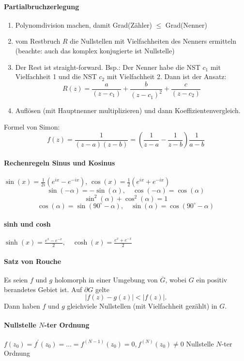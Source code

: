 \documentclass[a4paper, 10pt, DIV20, headings=small]{scrartcl}
\theoremstyle{definition}
\theoremstyle{plain}
\begin{document}
\paragraph{Partialbruchzerlegung}
\begin{enumerate}
\item Polynomdivision machen, damit Grad(Zähler) $\leq$ Grad(Nenner)
\item vom Restbruch $R$ die Nullstellen mit Vielfachheiten des Nenners ermitteln (beachte: auch das komplex konjugierte ist Nullstelle)
\item Der Rest ist straight-forward. Bsp.: Der Nenner habe die NST $c_1$ mit Vielfachheit 1 und die NST $c_2$ mit Vielfachheit 2. Dann ist der Ansatz: $$R(z) = \frac{a}{(z-c_1)} + \frac{b}{(z-c_1)^2} + \frac{c}{(z-c_2)}$$
\item Auflösen (mit Hauptnenner multiplizieren) und dann Koeffizientenvergleich.
\end{enumerate}
Formel von Simon:
$$f(z) = \frac{1}{(z-a)(z-b)} = \left(\frac{1}{z-a} - \frac{1}{z-b}\right) \frac{1}{a-b}$$

\paragraph{Rechenregeln Sinus und Kosinus}
$\sin(x) = \frac{1}{2i} (e^{ix}-e^{-ix})$, $\cos(x) = \frac{1}{2} (e^{ix}+e^{-ix})$
$$\sin(-\alpha) = - \sin(\alpha), \quad \cos(-\alpha) = \cos(\alpha)$$
$$\sin^2(\alpha) + \cos^2(\alpha) = 1$$
$$\cos(\alpha) = \sin(90^\circ - \alpha), \quad \sin(\alpha) = \cos(90^\circ - \alpha)$$

\paragraph{sinh und cosh}
$\sinh(x) = \frac{e^x - e^{-x}}{2}, \quad \cosh(x) = \frac{e^x + e^{-x}}{2}$

\paragraph{Satz von Rouche}
Es seien $f$ und $g$ holomorph in einer Umgebung von $\overline{G}$, wobei $G$ ein positiv berandetes Gebiet ist. Auf $\partial G$ gelte
$$|f(z)-g(z)| < |f(z)|.$$
Dann haben $f$ und $g$ gleichviele Nullstellen (mit Vielfachheit gezählt) in $G$.

\paragraph{Nullstelle $N$-ter Ordnung}
$f(z_0) = f^\prime(z_0) = \ldots = f^{(N-1)}(z_0) = 0, f^{(N)}(z_0) \neq 0$ Nullstelle $N$-ter Ordnung
\end{document}
